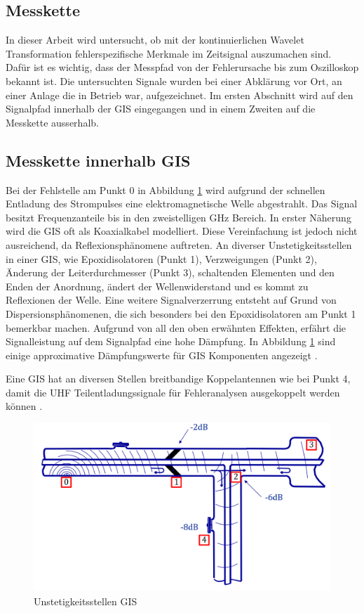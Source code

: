 \begin{refsection}
\section{Messkette}
%
In dieser Arbeit wird untersucht, ob mit der kontinuierlichen Wavelet Transformation fehlerspezifische Merkmale im Zeitsignal auszumachen sind. 
Dafür ist es wichtig, dass der Messpfad von der Fehlerursache bis zum Oszilloskop bekannt ist. 
%
Die untersuchten Signale wurden bei einer Abklärung vor Ort, an einer Anlage die in Betrieb war, aufgezeichnet.  
Im ersten Abschnitt wird auf den Signalpfad innerhalb der GIS eingegangen und in einem Zweiten auf die Messkette ausserhalb.
\subsection{Messkette innerhalb GIS}
Bei der Fehlstelle am Punkt 0 in Abbildung \ref{fig:messketteingis} wird aufgrund der schnellen Entladung des Strompulses eine elektromagnetische Welle abgestrahlt. 
Das Signal besitzt Frequenzanteile bis in den zweistelligen GHz Bereich. 
In erster Näherung wird die GIS oft als Koaxialkabel modelliert. 
%
Diese Vereinfachung ist jedoch nicht ausreichend, da Reflexionsphänomene auftreten. 
%
An diverser Unstetigkeitsstellen in einer GIS, wie Epoxidisolatoren (Punkt 1), Verzweigungen (Punkt 2),  Änderung der Leiterdurchmesser (Punkt 3), schaltenden Elementen und den Enden der Anordnung, ändert der Wellenwiderstand und es kommt zu Reflexionen der Welle.
%
Eine weitere Signalverzerrung entsteht auf Grund von Dispersionsphänomenen, die sich besonders bei den Epoxidisolatoren am Punkt 1 bemerkbar machen. 
%
%
Aufgrund von all den oben erwähnten Effekten, erfährt die Signalleistung auf dem Signalpfad eine hohe Dämpfung.
In Abbildung \ref{fig:messketteingis} sind einige approximative Dämpfungswerte für GIS Komponenten angezeigt  \cite{report:PDBasicABB}.

Eine GIS hat an diversen Stellen breitbandige Koppelantennen wie bei Punkt 4, damit die UHF Teilentladungssignale für Fehleranalysen ausgekoppelt werden können \cite{buch:UHFSignale, skript:Judd24ps, buch:Kuchler}.
%
\begin{figure}
	\centering
	\includegraphics[width=0.9\linewidth]{papers/gis/Bilder/MessketteInGIS}
	\caption{Unstetigkeitsstellen GIS \cite{report:PDBasicABB}}
	\label{fig:messketteingis}
\end{figure}

\end{refsection}
